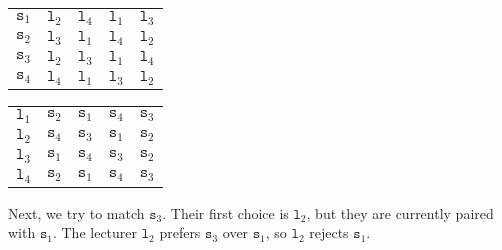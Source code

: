 \documentclass[a4paper, openany]{memoir}
\begin{document}
    \begin{table}[H]
        \centering
        \begin{subtable}{0.45\textwidth}
            \centering
            \begin{tabular}{c|cccc}
                $\texttt{s}_1$ & \underline{$\texttt{l}_2$} & $\texttt{l}_4$ & $\texttt{l}_1$ & $\texttt{l}_3$ \\
                $\texttt{s}_2$ & \underline{$\texttt{l}_3$} & $\texttt{l}_1$ & $\texttt{l}_4$ & $\texttt{l}_2$ \\
                $\texttt{s}_3$ & \underline{$\texttt{l}_2$} & $\texttt{l}_3$ & $\texttt{l}_1$ & $\texttt{l}_4$ \\
                $\texttt{s}_4$ & $\texttt{l}_4$ & $\texttt{l}_1$ & $\texttt{l}_3$ & $\texttt{l}_2$
            \end{tabular}
        \end{subtable}
        \hfill
        \begin{subtable}{0.45\textwidth}
            \centering
            \begin{tabular}{c|cccc}
                $\texttt{l}_1$ & $\texttt{s}_2$ & $\texttt{s}_1$ & $\texttt{s}_4$ & $\texttt{s}_3$ \\
                $\texttt{l}_2$ & $\texttt{s}_4$ & \underline{$\texttt{s}_3$} & \underline{$\texttt{s}_1$} & $\texttt{s}_2$ \\
                $\texttt{l}_3$ & $\texttt{s}_1$ & $\texttt{s}_4$ & $\texttt{s}_3$ & \underline{$\texttt{s}_2$} \\
                $\texttt{l}_4$ & $\texttt{s}_2$ & $\texttt{s}_1$ & $\texttt{s}_4$ & $\texttt{s}_3$
            \end{tabular}
        \end{subtable}
    \end{table}
    \noindent Next, we try to match $\texttt{s}_3$. Their first choice is $\texttt{l}_2$, but they are currently paired with $\texttt{s}_1$. The lecturer $\texttt{l}_2$ prefers $\texttt{s}_3$ over $\texttt{s}_1$, so $\texttt{l}_2$ rejects $\texttt{s}_1$. 
\end{document}
